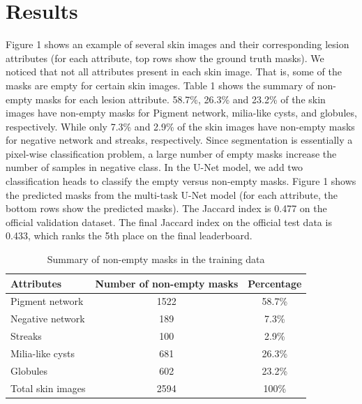 \documentclass{article}
\begin{document}
\section{Results}
Figure 1 shows an example of several skin images and their corresponding lesion attributes (for each attribute, top rows show the ground truth masks).  We noticed that not all attributes present in each skin image. That is, some of the masks are empty for certain skin images. Table 1 shows the summary of non-empty masks for each lesion attribute. 58.7\%, 26.3\% and 23.2\% of the skin images have non-empty masks for Pigment network, milia-like cysts, and globules, respectively.  While only 7.3\% and 2.9\% of the skin images have non-empty masks for negative network and streaks, respectively. Since segmentation is essentially a pixel-wise classification problem, a large number of empty masks increase the number of samples in negative class.  In the U-Net model, we add two classification heads to classify the empty versus non-empty masks. Figure 1 shows the predicted masks from the multi-task U-Net model (for each attribute, the bottom rows show the predicted masks). The Jaccard index is 0.477 on the official validation dataset. The final Jaccard index on the official test data is 0.433, which ranks the 5th place on the final leaderboard.









\begin{table}
  \caption{Summary of non-empty masks in the training data}
  \label{summary-training}
  \centering
  \begin{tabular}{lcc}
    \toprule
    Attributes     &   Number of non-empty masks   & Percentage   \\
    \midrule
    Pigment network & 1522  & 58.7\%    \\
    Negative network     & 189 & 7.3\%      \\
    Streaks     & 100       & 2.9\%  \\
    Milia-like cysts & 681  & 26.3\%     \\
    Globules     & 602 & 23.2\%      \\
    \midrule
    Total skin images & 2594 & 100\% \\
    \bottomrule
  \end{tabular}
\end{table}
\end{document}
